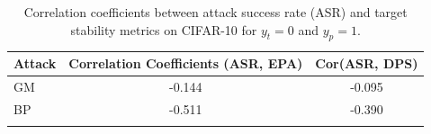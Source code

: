 \begin{table}[t]
\centering
\begin{tabular}{lcc}
\toprule
Attack & Correlation Coefficients (ASR, EPA) & Cor(ASR, DPS) \\
\midrule
GM & -0.144 & -0.095 \\
BP & -0.511 & -0.390 \\
\bottomrule
\caption{Correlation coefficients between attack success rate (ASR) and target stability metrics on CIFAR-10 for $y_t=0$ and $y_p=1$.}
\label{tab:cifar10_corr_epa_dps}
\end{tabular}
\end{table}
